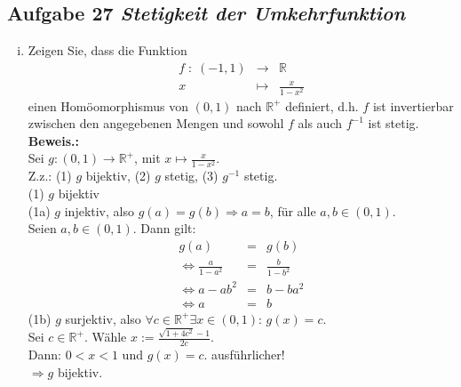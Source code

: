 \subsection*{Aufgabe 27 \mdseries\itshape Stetigkeit der Umkehrfunktion}

\begin{enumerate}[(i)]
   \item Zeigen Sie, dass die Funktion 
        $$\begin{array}{rcl}
            f \; : \; (-1,1) &\longrightarrow& \mathbb{R}\\
                x & \mapsto & \frac{x}{1 - x^2}
        \end{array}$$
        einen Homöomorphismus von $(0,1)$ nach $\mathbb{R}^+$ definiert, d.h. 
        $f$ ist invertierbar zwischen den angegebenen Mengen und sowohl $f$ als auch
        $f^{-1}$ ist stetig.\\

    \textbf{Beweis.:}\\
        Sei $g : (0,1) \to \mathbb{R}^+$, mit $x \mapsto \frac{x}{1 - x^2}$.\\
        Z.z.: (1) $g$ bijektiv, (2) $g$ stetig, (3) $g^{-1}$ stetig. \\

        (1) $g$ bijektiv \\
            (1a) $g$ injektiv, also $g(a) = g(b) \Rightarrow a = b$, für alle $a,b \in (0,1)$. \\
                Seien $a,b \in (0,1)$. Dann gilt:
                \begin{eqnarray*}
                  g(a) &=& g(b) \\
                  \Leftrightarrow \frac{a}{1 - a^2} &=& \frac{b}{1 - b^2} \\
                  \Leftrightarrow a - ab^2 &=& b - ba^2 \\
                  \Leftrightarrow a &=& b
                \end{eqnarray*}
            (1b) $g$ surjektiv, also $\forall c \in \mathbb{R}^+ \exists x \in (0,1):\, g(x) = c$.\\
                Sei $c \in \mathbb{R}^+$. Wähle $x := \frac{\sqrt{1+4c^2}-1}{2c}$. \\
                Dann: $0 < x < 1$ und $g(x) = c$. ausführlicher! \\
                $\Rightarrow g$ bijektiv. \\


\end{enumerate}
